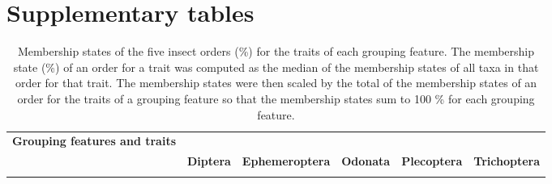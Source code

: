 \clearpage

\section{Supplementary tables}
\label{Supplementary tables}

\setlength{\LTcapwidth}{\linewidth}

\begin{longtable}[c]{>{\centering\arraybackslash}m{3.6cm}>{\centering\arraybackslash}m{1.3cm}>{\centering\arraybackslash}m{2.0cm}>{\centering\arraybackslash}m{1.3cm}>{\centering\arraybackslash}m{1.5cm}>{\centering\arraybackslash}m{1.5cm}}

\caption{Membership states of the five insect orders (\%) for the traits of each grouping feature. The membership state (\%) of an order for a trait was computed as the median of the membership states of all taxa in that order for that trait. The membership states were then scaled by the total of the membership states of an order for the traits of a grouping feature so that the membership states sum to 100 \% for each grouping feature.}

\centering

\hline
\textbf{Grouping features and traits} & \multicolumn{5}{c}{\textbf{Aquatic insect orders}}\\
 & \textbf{Diptera} & \textbf{Ephemeroptera} & \textbf{Odonata} & \textbf{Plecoptera} & \textbf{Trichoptera}\\
\hline
\endfirsthead

\hline
\endhead

\hline
\endfoot

\hline
\endlastfoot


\end{longtable}
